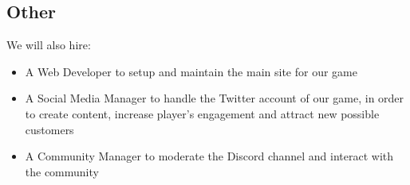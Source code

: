 \subsection{Other}

We will also hire:

\begin{itemize}
	\item A Web Developer to setup and maintain the main site for our game
	\item A Social Media Manager to handle the Twitter account of our game, in order to create content, increase player's engagement and attract new possible customers
	\item A Community Manager to moderate the Discord channel and interact with the community 
\end{itemize}
